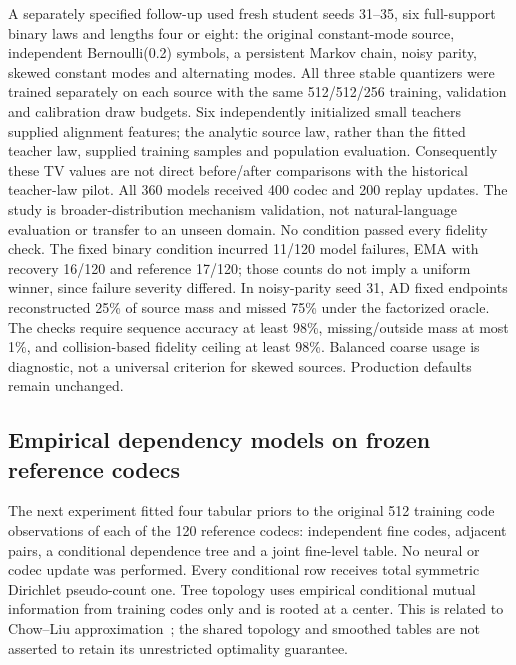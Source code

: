 A separately specified follow-up used fresh student seeds 31--35, six full-support
binary laws and lengths four or eight: the original constant-mode source,
independent Bernoulli(0.2) symbols, a persistent Markov chain, noisy parity,
skewed constant modes and alternating modes. All three stable quantizers were
trained separately on each source with the same 512/512/256 training,
validation and calibration draw budgets. Six independently initialized small
teachers supplied alignment features; the analytic source law, rather than the
fitted teacher law, supplied training samples and population evaluation.
Consequently these TV values are not direct before/after comparisons with the
historical teacher-law pilot. All 360 models received 400 codec and 200 replay
updates. The study is broader-distribution mechanism validation, not
natural-language evaluation or transfer to an unseen domain.
\RecentDomainTable
No condition passed every fidelity check. The fixed binary condition incurred
11/120 model failures, EMA with recovery 16/120 and reference 17/120; those
counts do not imply a uniform winner, since failure severity differed. In
noisy-parity seed 31, AD fixed endpoints reconstructed 25\% of source mass and
missed 75\% under the factorized oracle. The checks require sequence accuracy
at least 98\%, missing/outside mass at most 1\%, and collision-based fidelity
ceiling at least 98\%. Balanced coarse usage is diagnostic, not a universal
criterion for skewed sources. Production defaults remain unchanged.

\subsection{Empirical dependency models on frozen reference codecs}
The next experiment fitted four tabular priors to the original 512 training
code observations of each of the 120 reference codecs: independent fine codes,
adjacent pairs, a conditional dependence tree and a joint fine-level table.
No neural or codec update was performed. Every conditional row receives total
symmetric Dirichlet pseudo-count one. Tree topology uses empirical conditional
mutual information from training codes only and is rooted at a center. This
is related to Chow--Liu approximation~\citep{chow1968}; the shared topology and
smoothed tables are not asserted to retain its unrestricted optimality guarantee.


